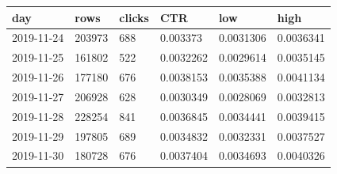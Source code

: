 \begin{tabular}{llllll}
\hline
day & rows & clicks & CTR & low & high \\
\hline
2019-11-24 & 203973 & 688 & 0.003373 & 0.0031306 & 0.0036341 \\
2019-11-25 & 161802 & 522 & 0.0032262 & 0.0029614 & 0.0035145 \\
2019-11-26 & 177180 & 676 & 0.0038153 & 0.0035388 & 0.0041134 \\
2019-11-27 & 206928 & 628 & 0.0030349 & 0.0028069 & 0.0032813 \\
2019-11-28 & 228254 & 841 & 0.0036845 & 0.0034441 & 0.0039415 \\
2019-11-29 & 197805 & 689 & 0.0034832 & 0.0032331 & 0.0037527 \\
2019-11-30 & 180728 & 676 & 0.0037404 & 0.0034693 & 0.0040326 \\
\hline
\end{tabular}